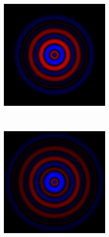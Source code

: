 \begin{figure}[p]
\begin{subfigure}[b]{0.3\textwidth}
        \includegraphics[width=\textwidth]{include/graphics/image7}
    \end{subfigure}
    ~
    \begin{subfigure}[b]{0.3\textwidth}
        \includegraphics[width=\textwidth]{include/graphics/image8}
    \end{subfigure}
    

\end{figure}
